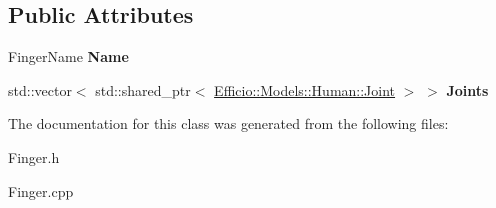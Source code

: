 \subsection*{Public Attributes}
\begin{DoxyCompactItemize}
\item 
Finger\+Name {\bfseries Name}\hypertarget{class_efficio_1_1_models_1_1_human_1_1_finger_ae73134fdf9c0ba485fce08abdf2e5e59}{}\label{class_efficio_1_1_models_1_1_human_1_1_finger_ae73134fdf9c0ba485fce08abdf2e5e59}

\item 
std\+::vector$<$ std\+::shared\+\_\+ptr$<$ \hyperlink{class_efficio_1_1_models_1_1_human_1_1_joint}{Efficio\+::\+Models\+::\+Human\+::\+Joint} $>$ $>$ {\bfseries Joints}\hypertarget{class_efficio_1_1_models_1_1_human_1_1_finger_a4799ad6515da36704d26aa1fa1817f92}{}\label{class_efficio_1_1_models_1_1_human_1_1_finger_a4799ad6515da36704d26aa1fa1817f92}

\end{DoxyCompactItemize}


The documentation for this class was generated from the following files\+:\begin{DoxyCompactItemize}
\item 
Finger.\+h\item 
Finger.\+cpp\end{DoxyCompactItemize}
